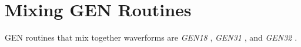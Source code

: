 \begin{comment}
\documentclass[10pt]{article}
\usepackage{fullpage, graphicx, url}
\setlength{\parskip}{1ex}
\setlength{\parindent}{0ex}
\title{Mixing GEN Routines}



\begin{tabular}{ccc}
The Alternative Csound Reference Manual & & \\
Previous &The Standard Numeric Score &Next

\end{tabular}

\end{comment}
\section{Mixing GEN Routines}


  GEN routines that mix together waverforms are \emph{GEN18}
, \emph{GEN31}
, and \emph{GEN32}
. 


\begin{comment}
\begin{tabular}{lcr}
Previous &Home &Next \\
Amplitude Scaling GEN Routines &Up &Reference

\end{tabular}



\end{comment}
